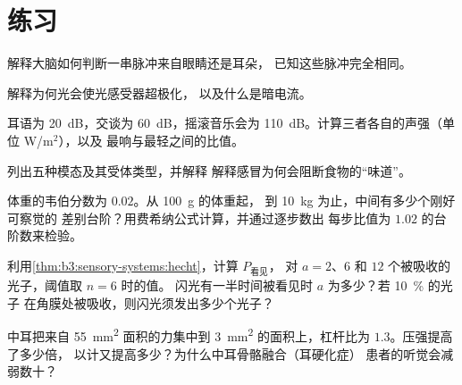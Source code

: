 \section{练习}

\begin{exercise}[$\star$]\label{exo:b3:sensory-systems:1}
解释大脑如何判断一串脉冲来自眼睛还是耳朵，
已知这些脉冲完全相同。
\end{exercise}

\begin{exercise}[$\star$]\label{exo:b3:sensory-systems:2}
解释为何光会使光感受器超极化，
以及什么是暗电流。
\end{exercise}

\begin{exercise}[$\star$]\label{exo:b3:sensory-systems:3}
耳语为 \qty{20}{dB}，交谈为 \qty{60}{dB}，摇滚音乐会为
\qty{110}{dB}。计算三者各自的声强（单位 W/m$^{2}$），以及
最响与最轻之间的比值。
\end{exercise}

\begin{exercise}[$\star$]\label{exo:b3:sensory-systems:4}
列出五种模态及其受体类型，并解释
解释感冒为何会阻断食物的“味道”。
\end{exercise}

\begin{exercise}[$\star\star$]\label{exo:b3:sensory-systems:5}
体重的韦伯分数为 $0.02$。从 \qty{100}{g} 的体重起，
到 \qty{10}{kg} 为止，中间有多少个刚好可察觉的
差别台阶？用费希纳公式计算，并通过逐步数出
每步比值为 $1.02$ 的台阶数来检验。
\end{exercise}

\begin{exercise}[$\star\star$]\label{exo:b3:sensory-systems:6}
利用\cref{thm:b3:sensory-systems:hecht}，计算 $P_{\text{看见}}$，
对 $a = 2$、$6$ 和 $12$ 个被吸收的光子，阈值取 $n = 6$ 时的值。
闪光有一半时间被看见时 $a$ 为多少？若 \qty{10}{\%} 的光子
在角膜处被吸收，则闪光须发出多少个光子？
\end{exercise}

\begin{exercise}[$\star\star$]\label{exo:b3:sensory-systems:7}
中耳把来自 \qty{55}{mm^2} 面积的力集中到
\qty{3}{mm^2} 的面积上，杠杆比为 $1.3$。压强提高了多少倍，
以计又提高多少？为什么中耳骨骼融合（耳硬化症）
患者的听觉会减弱数十？
\end{exercise}

